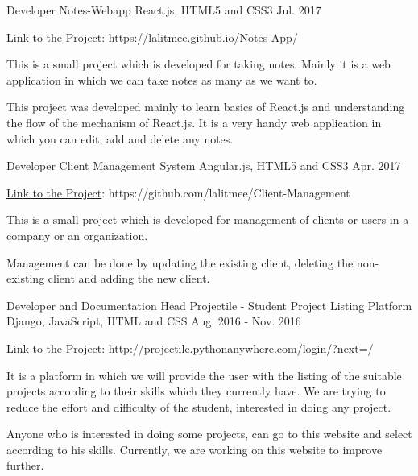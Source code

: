 \begin{cventries}
  \cventry
    {Developer }
    {Notes-Webapp}
    {React.js, HTML5 and CSS3}
    {Jul. 2017}
    {
      \begin{cvitems}
      \item{\href{https://lalitmee.github.io/Notes-App/}{Link to the Project}: https://lalitmee.github.io/Notes-App/ }
        \item {This is a small project which is developed for taking notes. Mainly it is a web application in which we can take notes as many as we want to. }
        \item{This project was developed mainly to learn basics of React.js and understanding the flow of the mechanism of React.js. It is a very handy web application in which you can edit, add and delete any notes.}
      \end{cvitems}
     }
\end{cventries}
\begin{cventries}
  \cventry
    {Developer }
    {Client Management System}
    {Angular.js, HTML5 and CSS3}
    {Apr. 2017}
    {
      \begin{cvitems}
      \item{\href{https://github.com/lalitmee/Client-Management}{Link to the Project}: https://github.com/lalitmee/Client-Management }
        \item {This is a small project which is developed for management of clients or users in a company or an organization. }
        \item{Management can be done by updating the existing client, deleting the non-existing client and adding the new client.}
      \end{cvitems}
     }
\end{cventries}
\begin{cventries}
  \cventry
    {Developer and Documentation Head}
    {Projectile - Student Project Listing Platform}
    {Django, JavaScript, HTML and CSS}
    {Aug. 2016 - Nov. 2016}
    {
      \begin{cvitems}
      \item{\href{http://projectile.pythonanywhere.com/login/?next=/}{Link to the Project}: http://projectile.pythonanywhere.com/login/?next=/ }
        \item {It is a platform in which we will provide the user with the listing of the suitable projects according to their skills which they currently have. We are trying to reduce the effort and difficulty of the student, interested in doing any project.}
        \item{Anyone who is interested in doing some projects, can go to this website and select according to his skills. Currently, we are working on this website to improve further.}
      \end{cvitems}
     }
\end{cventries}
